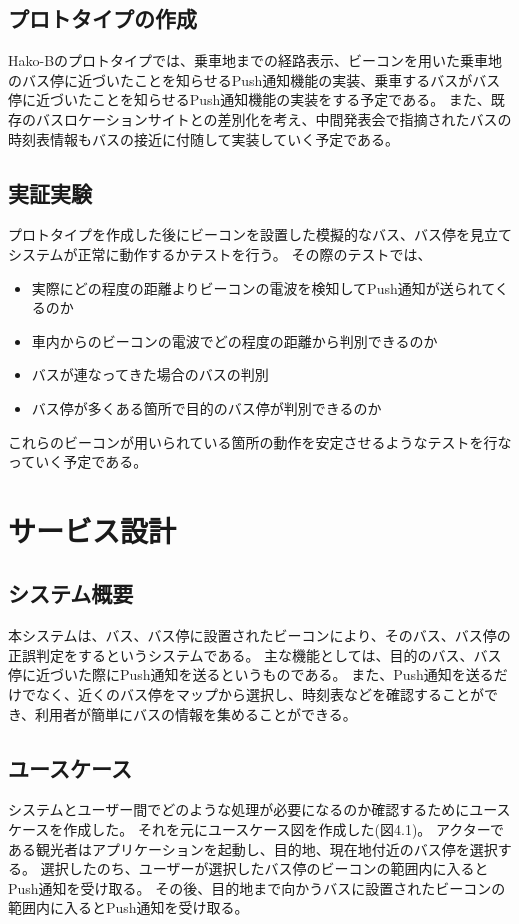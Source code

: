 \documentclass[openany,11pt,papersize]{jsbook}
\begin{document}
\subsection{プロトタイプの作成}
Hako-Bのプロトタイプでは、乗車地までの経路表示、ビーコンを用いた乗車地のバス停に近づいたことを知らせるPush通知機能の実装、乗車するバスがバス停に近づいたことを知らせるPush通知機能の実装をする予定である。
また、既存のバスロケーションサイトとの差別化を考え、中間発表会で指摘されたバスの時刻表情報もバスの接近に付随して実装していく予定である。


\subsection{実証実験}
プロトタイプを作成した後にビーコンを設置した模擬的なバス、バス停を見立てシステムが正常に動作するかテストを行う。
その際のテストでは、
\begin{itemize}

\item 実際にどの程度の距離よりビーコンの電波を検知してPush通知が送られてくるのか
\item 車内からのビーコンの電波でどの程度の距離から判別できるのか
\item バスが連なってきた場合のバスの判別
\item バス停が多くある箇所で目的のバス停が判別できるのか

\end{itemize}
これらのビーコンが用いられている箇所の動作を安定させるようなテストを行なっていく予定である。


\section{サービス設計}

\subsection{システム概要}
本システムは、バス、バス停に設置されたビーコンにより、そのバス、バス停の正誤判定をするというシステムである。
主な機能としては、目的のバス、バス停に近づいた際にPush通知を送るというものである。
また、Push通知を送るだけでなく、近くのバス停をマップから選択し、時刻表などを確認することができ、利用者が簡単にバスの情報を集めることができる。


\subsection{ユースケース}
システムとユーザー間でどのような処理が必要になるのか確認するためにユースケースを作成した。
それを元にユースケース図を作成した(図4.1)。
アクターである観光者はアプリケーションを起動し、目的地、現在地付近のバス停を選択する。
選択したのち、ユーザーが選択したバス停のビーコンの範囲内に入るとPush通知を受け取る。
その後、目的地まで向かうバスに設置されたビーコンの範囲内に入るとPush通知を受け取る。
\end{document}
